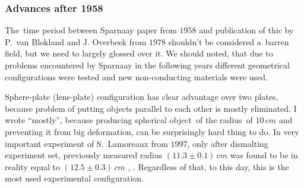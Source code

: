 \documentclass[10pt,t]{beamer}
\begin{document}
\begin{frame}
  \frametitle{Advances after 1958}


  The~time period between Sparnaay paper from $1958$ and publication of
  thic by P.~van Blokland and J. Overbeek from $1978$ shouldn't be
  considered a~barren field, but we need to largely glossed over it.
  We should
  noted, that due to problems encountered by Sparnaay in the following
  years different geometrical configurations were tested and new
  non-conducting materials were used.

  Sphere-plate (lens-plate) configuration has clear advantage over two
  plates, because problem of putting objects parallel to each other is
  mostly eliminated. I wrote ``mostly'', because producing spherical
  object~of the radius~of $10 \, \si{cm}$ and preventing it from big
  deformation, can be surprisingly hard thing to do. In very important
  experiment of S.~Lamoreaux from $1997$, only after dismalting experiment
  set, previously measured radius $( 11.3 \pm 0.1 ) \, \si{cm}$ was found to
  be in reality equal to $( 12.5 \pm 0.3 ) \, \si{cm}$
  \parencite{Lamoreaux-Demonstration-of-the-Casimir-Force-ETC-Pub-1997},
  \parencite{Lamoreaux-Erratum-Demonstration-of-the-Casimir-ETC-Pub-1998}.
  Regardless of that, to this day, this is the most used experimental
  configuration.

\end{frame}
\end{document}
